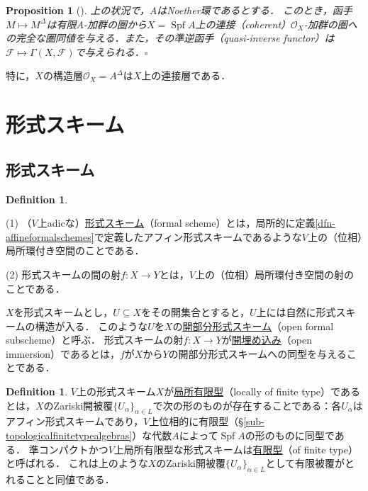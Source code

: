 \documentclass[a4paper,12pt, dvipdfmx]{jsbook}
\def\O{\mathscr{O}}
\def\Spf{\mathop{\mathrm{Spf}}\nolimits}
\theoremstyle{plain}
\newtheorem{prop}[thm]{\bfseries Proposition}
\theoremstyle{definition}
\newtheorem{dfn}[thm]{\bfseries Definition}
\begin{document}
\begin{prop}[{\rm \cite[Chap.\ II, Theorem 9.7]{Hart2}}]\label{prop-deltaconstruction}{\rm 
上の状況で，$A$はNoether環であるとする．
このとき，函手$M\mapsto M^{\Delta}$は有限$A$-加群の圏から$X=\Spf A$上の連接（coherent）$\O_X$-加群の圏への完全な圏同値を与える．また，その準逆函手（quasi-inverse functor）は$\mathscr{F}\mapsto\Gamma(X,\mathscr{F})$で与えられる．}\hfill$\square$
\end{prop}

特に，$X$の構造層$\O_X=A^{\Delta}$は$X$上の連接層である．

\section{形式スキーム}\label{sec-formalschemes}
\subsection{形式スキーム}\label{sub-formalschemes}
\begin{dfn}\label{dfn-formalschemes}{\rm 
(1) （$V$上adicな）\underline{形式スキーム}（formal scheme）とは，局所的に定義\ref{dfn-affineformalschemes}で定義したアフィン形式スキームであるような$V$上の（位相）局所環付き空間のことである．

(2) 形式スキームの間の射$f\colon X\rightarrow Y$とは，$V$上の（位相）局所環付き空間の射のことである．}
\end{dfn}

$X$を形式スキームとし，$U\subseteq X$をその開集合とすると，$U$上には自然に形式スキームの構造が入る．
このような$U$を$X$の\underline{開部分形式スキーム}（open formal subscheme）と呼ぶ．
形式スキームの射$f\colon X\rightarrow Y$が\underline{開埋め込み}（open immersion）であるとは，$f$が$X$から$Y$の開部分形式スキームへの同型を与えることである．

\begin{dfn}\label{dfn-finitetypeformalschemes}{\rm 
$V$上の形式スキーム$X$が\underline{局所有限型}（locally of finite type）であるとは，$X$のZariski開被覆$\{U_{\alpha}\}_{\alpha\in L}$で次の形のものが存在することである：各$U_{\alpha}$はアフィン形式スキームであり，$V$上位相的に有限型（\S\ref{sub-topologicalfinitetypealgebras}）な代数$A$によって$\Spf A$の形のものに同型である．
準コンパクトかつ$V$上局所有限型な形式スキームは\underline{有限型}（of finite type）と呼ばれる．
これは上のような$X$のZariski開被覆$\{U_{\alpha}\}_{\alpha\in L}$として有限被覆がとれることと同値である．}
\end{dfn}
\end{document}
